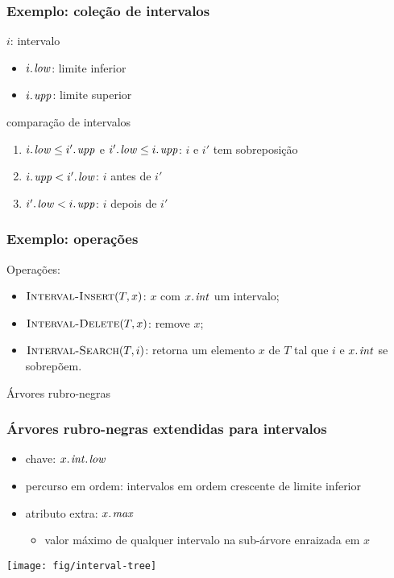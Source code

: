 \documentclass{beamer}
\begin{document}
\begin{frame}
\frametitle{Exemplo: coleção de intervalos}

$i$: intervalo 
\begin{itemize}
\item $\attrib{i}{low}$: limite inferior
\item $\attrib{i}{upp}$: limite superior
\end{itemize}

comparação de intervalos
\begin{enumerate}
\item $\attrib{i}{low} \le \attrib{i'}{upp}$ e $\attrib{i'}{low} \le \attrib{i}{upp}$: $i$ e $i'$ tem sobreposição
\item $\attrib{i}{upp} < \attrib{i'}{low}$: $i$ antes de $i'$
\item $\attrib{i'}{low} < \attrib{i}{upp}$: $i$ depois de $i'$
\end{enumerate}

\end{frame}

\begin{frame}
\frametitle{Exemplo: operações}

Operações:
\begin{itemize}
\item $\textnormal{\scshape Interval-Insert}(T, x)$: $x$ com $\attrib{x}{int}$ um intervalo;
\item $\textnormal{\scshape Interval-Delete}(T, x)$: remove $x$;
\item $\textnormal{\scshape Interval-Search}(T, i)$: retorna um elemento $x$ de $T$ tal que
  $i$ e $\attrib{x}{int}$ se sobrepõem.
\end{itemize}

\pause
\alert{Árvores rubro-negras}

\end{frame}

\begin{frame}
\frametitle{Árvores rubro-negras extendidas para intervalos}

\begin{itemize}
\item chave: $\attrib{\attrib{x}{int}}{low}$
\item percurso em ordem: intervalos em ordem crescente de limite inferior
\item atributo extra: $\attrib{x}{max}$
\begin{itemize}
\item valor máximo de qualquer intervalo na sub-árvore enraizada em $x$
\end{itemize}
\end{itemize}

\begin{center}
\texttt{[image: fig/interval-tree]}
\end{center}

\end{frame}
\end{document}
